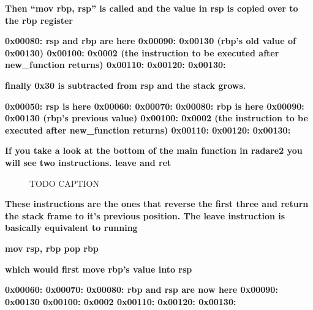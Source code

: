 \documentclass[letterpaper]{article}
\newcommand{\sitfig}[3]{
\begin{figure}[H]
\centering
\makebox[\textwidth][c]{
#2
}
\caption{#3}
\label{#1}
\end{figure}
}
\newcommand{\sitgfx}[4][scale=1.0]{
\sitfig{#3}{\texttt{[image: \#2]}}{#4}
}
\begin{document}
\textbf{Then ``mov rbp, rsp'' is called and the value in rsp is copied over to the rbp register}

\textbf{0x00080: rsp and rbp are here\newline
0x00090: 0x00130 (rbp's old value of 0x00130)\newline
0x00100: 0x0002 (the instruction to be executed after new\_function returns)\newline
0x00110:\newline
0x00120:\newline
0x00130:}

\textbf{finally 0x30 is subtracted from rsp and the stack grows.}

\textbf{0x00050: rsp is here\newline
0x00060:\newline
0x00070:\newline
0x00080: rbp is here\newline
0x00090: 0x00130 (rbp's previous value)\newline
0x00100: 0x0002 (the instruction to be executed after new\_function returns)\newline
0x00110:\newline
0x00120:\newline
0x00130:}

\textbf{If you take a look at the bottom of the main function in radare2 you will see two instructions. leave and ret}

  
\sitgfx[width=5.8335in,height=3.6457in]{FINALWORKINGDOCFORMERLYPRECURSOR-img089.png}{fig:unk}{TODO CAPTION}
 

\textbf{These instructions are the ones that reverse the first three and return the stack frame to it's previous
position. The leave instruction is basically equivalent to running}

\textbf{mov rsp, rbp\newline
pop rbp}

\textbf{which would first move rbp's value into rsp}

\textbf{0x00060:\newline
0x00070:\newline
0x00080: rbp and rsp are now here\newline
0x00090: 0x00130\newline
0x00100: 0x0002\newline
0x00110:\newline
0x00120:\newline
0x00130:}
\end{document}
